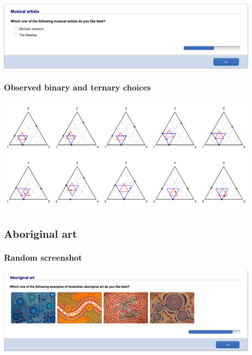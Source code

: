 \documentclass[11pt,letter]{article}
\begin{document}
\includegraphics[width=15cm]{Population_study_design/screenshot_Musical_Artists.png}

\subsubsection*{Observed binary and ternary choices}

\includegraphics[width=15cm]{./Population_study_data/Simplexes/Musical_artists.pdf}

\pagebreak

\subsection{Aboriginal art}



\subsubsection*{Random screenshot}

\includegraphics[width=15cm]{Population_study_design/screenshot_Aboriginal_Art.png}
\end{document}
